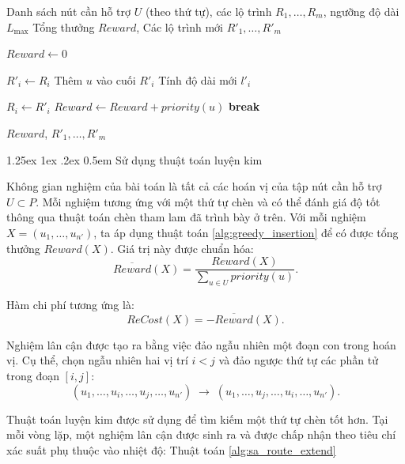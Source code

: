 \documentclass[a4paper]{article}
\makeatletter
\renewcommand{\paragraph}{%
  \@startsection{paragraph}{4}{\z@}%
  {1.25ex \@plus 1ex \@minus .2ex}%
  {0.5em}%
  {\normalfont\normalsize\bfseries}%
}
\makeatother
\begin{document}
\begin{algorithm}
\caption{Chèn tham lam dưới ràng buộc độ dài}
\label{alg:greedy_insertion}
\begin{algorithmic}[1]

\Require Danh sách nút cần hỗ trợ $U$ (theo thứ tự), các lộ trình $R_1, \dots, R_m$, ngưỡng độ dài $L_{\max}$
\Ensure Tổng thưởng $Reward$, Các lộ trình mới $R'_1, \dots, R'_m$

\State $Reward \gets 0$

        \State $R'_i \gets R_i$
        \State Thêm $u$ vào cuối $R'_i$
        \State Tính độ dài mới $l'_i$

            \State $R_i \gets R'_i$
            \State $Reward \gets Reward + priority(u)$
            \State \textbf{break}
        \EndIf
    \EndFor
\EndFor

\State \Return $Reward$, $R'_1, \dots, R'_m$

\end{algorithmic}
\end{algorithm}

\paragraph{Sử dụng thuật toán luyện kim}

Không gian nghiệm của bài toán là tất cả các hoán vị của tập nút cần hỗ trợ $U \subset P$. 
Mỗi nghiệm tương ứng với một thứ tự chèn và có thể đánh giá độ tốt thông qua thuật toán chèn tham lam đã trình bày ở trên. Với mỗi nghiệm $X = (u_1, \dots, u_{n'})$, ta áp dụng thuật toán \ref{alg:greedy_insertion} để có được tổng thưởng $Reward(X)$. 
Giá trị này được chuẩn hóa:
\begin{equation}
\overline{Reward}(X) = \frac{Reward(X)}{\sum_{u \in U} priority(u)}.
\end{equation}

Hàm chi phí tương ứng là:
\begin{equation}
ReCost(X) = -\overline{Reward}(X).
\end{equation}

Nghiệm lân cận được tạo ra bằng việc đảo ngẫu nhiên một đoạn con trong hoán vị. Cụ thể, chọn ngẫu nhiên hai vị trí $i < j$ và đảo ngược thứ tự các phần tử trong đoạn $[i, j]$:
\[
(u_1, \dots, u_i, \dots, u_j, \dots, u_{n'})
\;\rightarrow\;
(u_1, \dots, u_j, \dots, u_i, \dots, u_{n'}).
\]

Thuật toán luyện kim được sử dụng để tìm kiếm một thứ tự chèn tốt hơn. Tại mỗi vòng lặp, một nghiệm lân cận được sinh ra và được chấp nhận theo tiêu chí xác suất phụ thuộc vào nhiệt độ: Thuật toán \ref{alg:sa_route_extend}
\end{document}
